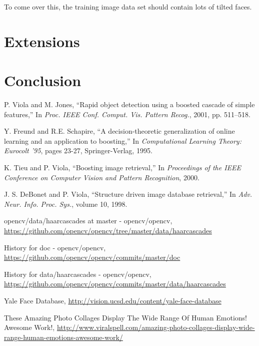 \documentclass[10pt,twocolumn,letterpaper]{article}
\begin{document}
To come over this, the training image data set should contain lots of tilted faces.

\section{Extensions}

%

\section{Conclusion}

\begin{thebibliography}{9}
P. Viola and M. Jones, ``Rapid object detection using a boosted cascade of simple features,''
In \textit{Proc. IEEE Conf. Comput. Vis. Pattern Recog.}, 2001, pp. 511–518.

Y. Freund and R.E. Schapire, ``A decision-theoretic generalization of online learning and an application to boosting,''
In \textit{Computational Learning Theory: Eurocolt '95}, pages 23-27, Springer-Verlag, 1995.

K. Tieu and P. Viola, ``Boosting image retrieval,''
In \textit{Proceedings of the IEEE Conference on Computer Vision and Pattern Recognition}, 2000.

J. S. DeBonet and P. Viola, ``Structure driven image database retrieval,''
In \textit{Adv. Neur. Info. Proc. Sys.}, volume 10, 1998.

opencv/data/haarcascades at master - opencv/opencv,
\url{https://github.com/opencv/opencv/tree/master/data/haarcascades}

History for doc - opencv/opencv,
\url{https://github.com/opencv/opencv/commits/master/doc}

History for data/haarcascades - opencv/opencv,
\url{https://github.com/opencv/opencv/commits/master/data/haarcascades}

Yale Face Database,
\url{http://vision.ucsd.edu/content/yale-face-database}

These Amazing Photo Collages Display The Wide Range Of Human Emotions! Awesome Work!,
\url{http://www.viralspell.com/amazing-photo-collages-display-wide-range-human-emotions-awesome-work/}

\end{thebibliography}
\end{document}
